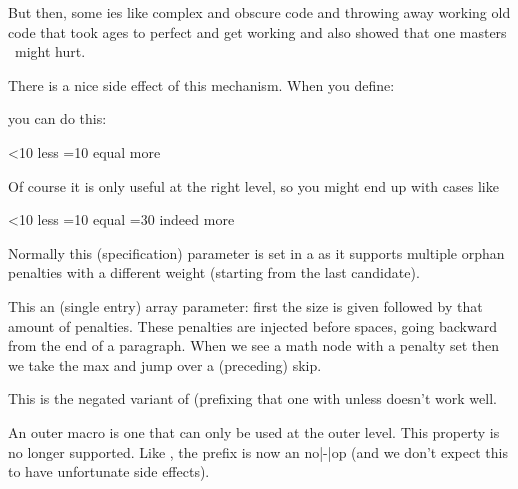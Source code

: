 But then, some \TEX ies like complex and obscure code and throwing away working
old code that took ages to perfect and get working and also showed that one
masters \TEX\ might hurt.

There is a nice side effect of this mechanism. When you define:

\starttyping
\def\quitcondition{\orelse\iffalse}
\stoptyping

you can do this:

\starttyping
\ifnum{}<10
    less
\orelse\ifnum{}=10
    equal
    \quitcondition
    indeed
\else
    more
\fi
\stoptyping

Of course it is only useful at the right level, so you might end up with cases like

\starttyping
\ifnum{}<10
    less
\orelse\ifnum{}=10
    equal
    \ifnum{}=30
        \expandafter\quitcondition
    \fi
    indeed
\else
    more
\fi
\stoptyping

\stopnewprimitive

\startnewprimitive[title={\prm {orphanlinefactors}}]

Normally this (specification) parameter is set in a  as it
supports multiple orphan penalties with a different weight (starting from the
last candidate).

\stopnewprimitive

\startnewprimitive[title={\prm {orphanpenalties}}]

This an (single entry) array parameter: first the size is given followed by that
amount of penalties. These penalties are injected before spaces, going backward
from the end of a paragraph. When we see a math node with a penalty set then we
take the max and jump over a (preceding) skip.

\stopnewprimitive

\startnewprimitive[title={\prm {orunless}}]

This is the negated variant of  (prefixing that one with \tex
{unless} doesn't work well.

\stopnewprimitive

\startoldprimitive[title={\prm {outer}}][obsolete=yes]

An outer macro is one that can only be used at the outer level. This property is
no longer supported. Like , the  prefix is now an
no|-|op (and we don't expect this to have unfortunate side effects).

\stopoldprimitive

